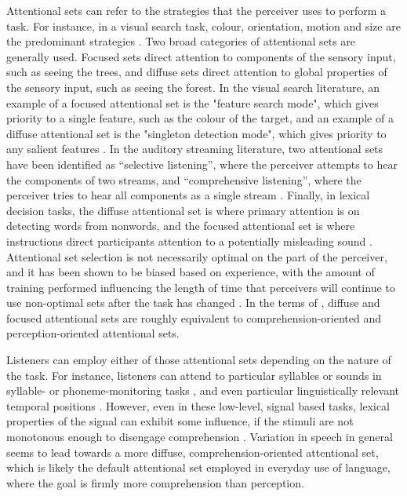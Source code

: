 Attentional sets can refer to the strategies that the perceiver uses to perform a task.  
For instance, in a visual search task, colour, orientation, motion and size are the predominant strategies \citep{Wolfe2004}.  
Two broad categories of attentional sets are generally used.  
Focused sets direct attention to components of the sensory input, such as seeing the trees, and diffuse sets direct attention to global properties of the sensory input, such as seeing the forest.  
In the visual search literature, an example of a focused attentional set is the "feature search mode", which gives priority to a single feature, such as the colour of the target, and an example of a diffuse attentional set is the "singleton detection mode", which gives priority to any salient features \citep{Bacon1994}. 
In the auditory streaming literature, two attentional sets have been identified as ``selective listening'', where the perceiver attempts to hear the components of two streams, and ``comprehensive listening'', where the perceiver tries to hear all components as a single stream  \citep{vanNoorden1975}.
Finally, in lexical decision tasks, the diffuse attentional set is where primary attention is on detecting words from nonwords, and the focused attentional set is where instructions direct participants attention to a potentially misleading sound \citep{Pitt2012}.
Attentional set selection is not necessarily optimal on the part of the perceiver, and it has been shown to be biased based on experience, with the amount of training performed influencing the length of time that perceivers will continue to use non-optimal sets after the task has changed \citep{Leber2006}.
In the terms of \citet{Cutler1987}, diffuse and focused attentional sets are roughly equivalent to comprehension-oriented and perception-oriented attentional sets.

Listeners can employ either of those attentional sets depending on the nature of the task.
For instance, listeners can attend to particular syllables or sounds in syllable- or phoneme-monitoring tasks \citep[and others]{Norris1988}, and even particular linguistically relevant temporal positions \citep{Pitt1990}.
However, even in these low-level, signal based tasks, lexical properties of the signal can exhibit some influence, if the stimuli are not monotonous enough to disengage comprehension \citep{Cutler1987}.  
Variation in speech in general seems to lead towards a more diffuse, comprehension-oriented attentional set, which is likely the default attentional set employed in everyday use of language, where the goal is firmly more comprehension than perception.

